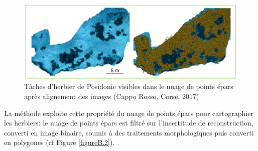 \begin{figure}[htpb]
	\begin{center}
	\includegraphics[width=\linewidth]{images/appendix_merigeo/Figure1.png}
		\caption[Tâches d’herbier de Posidonie visibles dans le nuage de points épars]{Tâches d’herbier de Posidonie visibles dans le nuage de points épars après alignement des images (Cappo Rosso, Corse, 2017)}
	\label{figureB.1}
\end{center}
\end{figure}

La méthode exploite cette propriété du nuage de points épars pour cartographier les herbiers: le nuage de points épars est filtré sur l’incertitude de reconstruction, converti en image binaire, soumis à des traitements morphologiques puis converti en polygones (cf Figure \ref{figureB.2}).

\newpage
